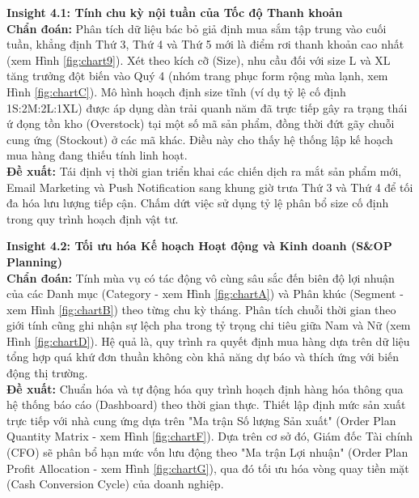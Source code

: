 \documentclass{article}
\begin{document}
\textbf{Insight 4.1: Tính chu kỳ nội tuần của Tốc độ Thanh khoản} \\
\textbf{Chẩn đoán:} Phân tích dữ liệu bác bỏ giả định mua sắm tập trung vào cuối tuần, khẳng định Thứ 3, Thứ 4 và Thứ 5 mới là điểm rơi thanh khoản cao nhất (xem Hình \ref{fig:chart9}). Xét theo kích cỡ (Size), nhu cầu đối với size L và XL tăng trưởng đột biến vào Quý 4 (nhóm trang phục form rộng mùa lạnh, xem Hình \ref{fig:chartC}). Mô hình hoạch định size tĩnh (ví dụ tỷ lệ cố định 1S:2M:2L:1XL) được áp dụng dàn trải quanh năm đã trực tiếp gây ra trạng thái ứ đọng tồn kho (Overstock) tại một số mã sản phẩm, đồng thời đứt gãy chuỗi cung ứng (Stockout) ở các mã khác. Điều này cho thấy hệ thống lập kế hoạch mua hàng đang thiếu tính linh hoạt.
\\
\textbf{Đề xuất:} Tái định vị thời gian triển khai các chiến dịch ra mắt sản phẩm mới, Email Marketing và Push Notification sang khung giờ trưa Thứ 3 và Thứ 4 để tối đa hóa lưu lượng tiếp cận. Chấm dứt việc sử dụng tỷ lệ phân bổ size cố định trong quy trình hoạch định vật tư.

\textbf{Insight 4.2: Tối ưu hóa Kế hoạch Hoạt động và Kinh doanh (S\&OP Planning)} \\
\textbf{Chẩn đoán:} Tính mùa vụ có tác động vô cùng sâu sắc đến biên độ lợi nhuận của các Danh mục (Category - xem Hình \ref{fig:chartA}) và Phân khúc (Segment - xem Hình \ref{fig:chartB}) theo từng chu kỳ tháng. Phân tích chuỗi thời gian theo giới tính cũng ghi nhận sự lệch pha trong tỷ trọng chi tiêu giữa Nam và Nữ (xem Hình \ref{fig:chartD}). Hệ quả là, quy trình ra quyết định mua hàng dựa trên dữ liệu tổng hợp quá khứ đơn thuần không còn khả năng dự báo và thích ứng với biến động thị trường.
\\
\textbf{Đề xuất:} Chuẩn hóa và tự động hóa quy trình hoạch định hàng hóa thông qua hệ thống báo cáo (Dashboard) theo thời gian thực. Thiết lập định mức sản xuất trực tiếp với nhà cung ứng dựa trên "Ma trận Số lượng Sản xuất" (Order Plan Quantity Matrix - xem Hình \ref{fig:chartF}). Dựa trên cơ sở đó, Giám đốc Tài chính (CFO) sẽ phân bổ hạn mức vốn lưu động theo "Ma trận Lợi nhuận" (Order Plan Profit Allocation - xem Hình \ref{fig:chartG}), qua đó tối ưu hóa vòng quay tiền mặt (Cash Conversion Cycle) của doanh nghiệp.

\end{document}
